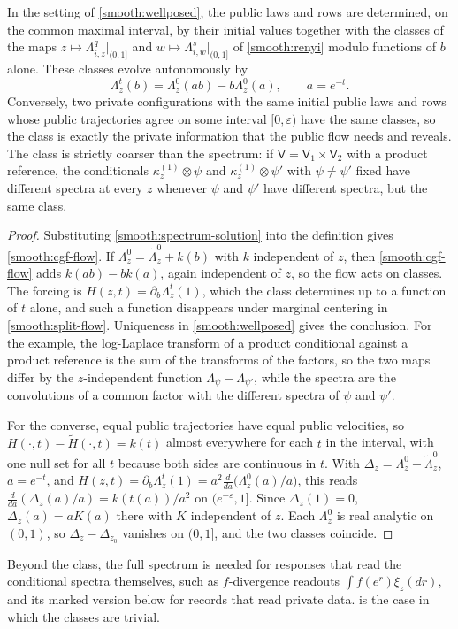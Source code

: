 In the setting of \cref{smooth:wellposed}, the public laws and rows are determined, on the common maximal interval, by their initial values together with the classes of the maps $z\mapsto\Lambda^q_{i,z}|_{(0,1]}$ and $w\mapsto\Lambda^s_{i,w}|_{(0,1]}$ of \cref{smooth:renyi} modulo functions of $b$ alone. These classes evolve autonomously by
\begin{equation}
 \Lambda^t_z(b)=\Lambda^0_z(ab)-b\Lambda^0_z(a),\qquad a=e^{-t}.
 \label{smooth:cgf-flow}
\end{equation}
Conversely, two private configurations with the same initial public laws and rows whose public trajectories agree on some interval $[0,\varepsilon)$ have the same classes, so the class is exactly the private information that the public flow needs and reveals. The class is strictly coarser than the spectrum: if $\mathsf V=\mathsf V_1\times\mathsf V_2$ with a product reference, the conditionals $\kappa^{(1)}_z\otimes\psi$ and $\kappa^{(1)}_z\otimes\psi'$ with $\psi\neq\psi'$ fixed have different spectra at every $z$ whenever $\psi$ and $\psi'$ have different spectra, but the same class.
\begin{proof}
Substituting \cref{smooth:spectrum-solution} into the definition gives \cref{smooth:cgf-flow}. If $\Lambda^0_z=\widetilde\Lambda^0_z+k(b)$ with $k$ independent of $z$, then \cref{smooth:cgf-flow} adds $k(ab)-bk(a)$, again independent of $z$, so the flow acts on classes. The forcing is $H(z,t)=\partial_b\Lambda^t_z(1)$, which the class determines up to a function of $t$ alone, and such a function disappears under marginal centering in \cref{smooth:split-flow}. Uniqueness in \cref{smooth:wellposed} gives the conclusion. For the example, the log-Laplace transform of a product conditional against a product reference is the sum of the transforms of the factors, so the two maps differ by the $z$-independent function $\Lambda_\psi-\Lambda_{\psi'}$, while the spectra are the convolutions of a common factor with the different spectra of $\psi$ and $\psi'$.

For the converse, equal public trajectories have equal public velocities, so $H(\cdot,t)-\widetilde H(\cdot,t)=k(t)$ almost everywhere for each $t$ in the interval, with one null set for all $t$ because both sides are continuous in $t$. With $\Delta_z=\Lambda^0_z-\widetilde\Lambda^0_z$, $a=e^{-t}$, and $H(z,t)=\partial_b\Lambda^t_z(1)=a^2\frac{d}{da}\bigl(\Lambda^0_z(a)/a\bigr)$, this reads $\frac{d}{da}(\Delta_z(a)/a)=k(t(a))/a^2$ on $(e^{-\varepsilon},1]$. Since $\Delta_z(1)=0$, $\Delta_z(a)=aK(a)$ there with $K$ independent of $z$. Each $\Lambda^0_z$ is real analytic on $(0,1)$, so $\Delta_z-\Delta_{z_0}$ vanishes on $(0,1]$, and the two classes coincide.
\end{proof}
Beyond the class, the full spectrum is needed for responses that read the conditional spectra themselves, such as $f$-divergence readouts $\int f(e^r)\xi_z(dr)$, and its marked version below for records that read private data.  is the case in which the classes are trivial.

